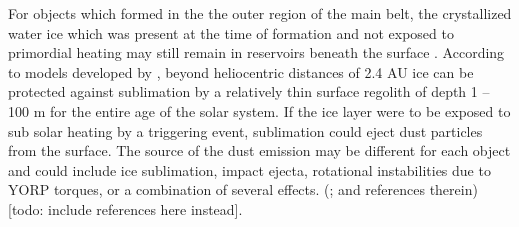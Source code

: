 \documentclass[iop,apj]{emulateapj}
\begin{document}

For objects which formed in the the outer region of the main belt, the crystallized water ice which was present at the time of formation and not exposed to primordial heating may still remain in reservoirs beneath the surface \citep{prialnik09}.  According to models developed by \citet*{fanale89},  beyond heliocentric distances of 2.4 AU ice can be protected against sublimation by a relatively thin surface regolith  of depth 1 -- 100 m for the entire age of the solar system. If the ice layer were to be exposed to sub solar heating by a triggering event, sublimation could eject dust particles from the surface. The source of the dust emission may be different for each object and could include ice sublimation, impact ejecta, rotational instabilities due to YORP torques, or a combination of several effects. (\cite{hsieh15}; and references therein) [todo: include references here instead].  

\end{document}

